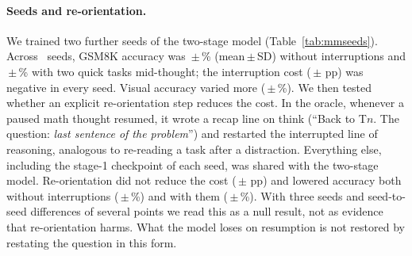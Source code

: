 \documentclass[10pt]{article}
\begin{document}
\paragraph{Seeds and re-orientation.} We trained two further seeds of the two-stage model (Table~\ref{tab:mmseeds}). Across \mmseedvn\ seeds, GSM8K accuracy was \mmseedvsolo\,$\pm$\,\mmseedvsolosd\% (mean\,$\pm$\,SD) without interruptions and \mmseedvasync\,$\pm$\,\mmseedvasyncsd\% with two quick tasks mid-thought; the interruption cost (\mmseedvdiff\,$\pm$\,\mmseedvdiffsd\,pp) was negative in every seed. Visual accuracy varied more (\mmseedvvis\,$\pm$\,\mmseedvvissd\%). We then tested whether an explicit re-orientation step reduces the cost. In the oracle, whenever a paused math thought resumed, it wrote a recap line on think (``Back to T$n$. The question: \textit{last sentence of the problem}'') and restarted the interrupted line of reasoning, analogous to re-reading a task after a distraction. Everything else, including the stage-1 checkpoint of each seed, was shared with the two-stage model. Re-orientation did not reduce the cost (\mmseedrdiff\,$\pm$\,\mmseedrdiffsd\,pp) and lowered accuracy both without interruptions (\mmseedrsolo\,$\pm$\,\mmseedrsolosd\%) and with them (\mmseedrasync\,$\pm$\,\mmseedrasyncsd\%). With three seeds and seed-to-seed differences of several points we read this as a null result, not as evidence that re-orientation harms. What the model loses on resumption is not restored by restating the question in this form.

\begin{table}[t]
\centering\small
\caption{Multimodal models per training seed. Accuracy in \% ($n=300$ GSM8K test problems; 300 vision episodes). $\Delta$: GSM8K async minus solo. Re-orientation models share the stage-1 checkpoint of the same seed.}
\label{tab:mmseeds}

\end{table}
\end{document}
